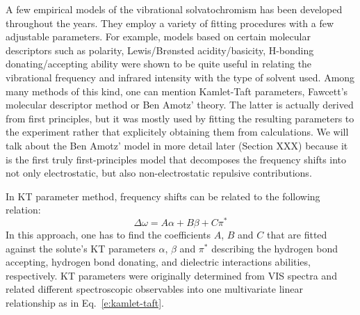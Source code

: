 \documentclass[a4paper,titlepage,twoside,fleqn,12pt]{book}
\begin{document}
\begin{refsection}
A few empirical models of the vibrational solvatochromism has been developed throughout the years.
They employ a variety of fitting procedures with a few adjustable parameters. For example, 
models based on certain molecular descriptors such as polarity, Lewis\slash{}Br{\o}nsted acidity\slash{}basicity, 
H-bonding donating\slash{}accepting ability were shown to be quite useful in relating the vibrational
frequency and infrared intensity with the type of solvent used. Among many methods of this kind,
one can mention Kamlet\hyp{}Taft parameters\citep{Kamlet.Taft.JACS.1976,Taft.Kamlet.JACS.1976,Kamlet.Abboud.Taft.JACS.1977}, 
Fawcett's molecular descriptor method\citep{Reimers.Hall.JACS.1999,
Fawcett.Liu.Kessler.JPC.1993,Fawcett.Kloss.JCP.1996} or Ben Amotz' theory.\citep{Ben-Amotz.Lee.Cho.List.JCP.1992} 
The latter is actually derived from first principles, but it was mostly used by fitting
the resulting parameters to the experiment rather that explicitely obtaining them from calculations.
We will talk about the Ben Amotz' model in more detail later (Section XXX) because it is the first
truly first\hyp{}principles model that decomposes the frequency shifts into not only electrostatic, 
but also non-electrostatic repulsive contributions.

In KT parameter method, frequency shifts can be related to the following
relation\citep{Zhang.Markiewicz.Doerksen.Smith.Gai.PCCP.2015}:
%
\begin{equation} \label{e:kamlet-taft}
\Delta \omega = A\alpha + B\beta + C\pi^{*}
\end{equation}
%
In this approach, one has to
find the coefficients $A$, $B$ and $C$ that are fitted against
the solute's KT parameters $\alpha$\citep{Taft.Kamlet.JACS.1976}, 
$\beta$\citep{Kamlet.Taft.JACS.1976} and $\pi^{*}$\citep{Kamlet.Abboud.Taft.JACS.1977} 
describing the hydrogen bond accepting,
hydrogen bond donating, and dielectric interactions abilities, respectively.
KT parameters were originally determined from VIS spectra and related different
spectroscopic observables into one multivariate linear relationship as in Eq.~\eqref{e:kamlet-taft}.


\end{refsection}
\end{document}
